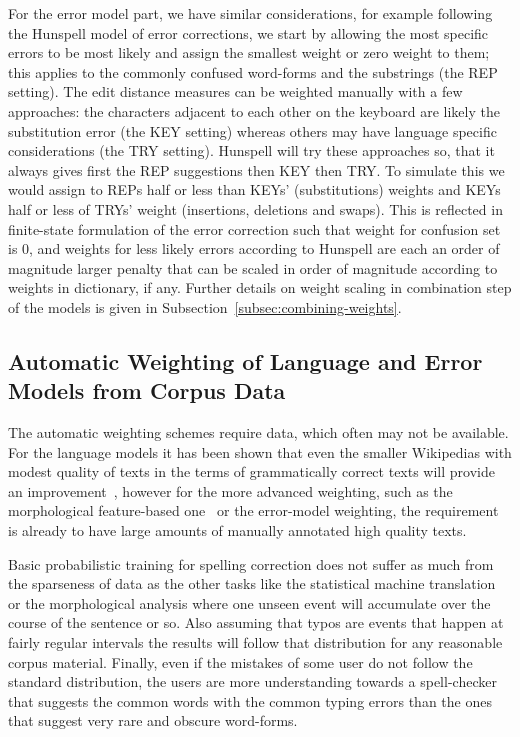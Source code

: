 \documentclass[a4paper,12pt]{article}
\begin{document}
For the error model part, we have similar considerations, for example
following the Hunspell model of error corrections, we start by allowing the
most specific errors to be most likely and assign the smallest weight or zero
weight to them; this applies to the commonly confused word-forms and the
substrings (the REP setting). The edit distance measures can be weighted
manually with a few approaches: the characters adjacent to each other on the
keyboard are likely the substitution error (the KEY setting) whereas others
may have language specific considerations (the TRY setting).  Hunspell will try
these approaches so, that it always gives first the REP suggestions then KEY
then TRY. To simulate this we would assign to REPs half or less than KEYs'
(substitutions) weights and KEYs half or less of TRYs' weight (insertions,
deletions and swaps). This is reflected in finite-state formulation of the
error correction such that weight for confusion set is 0, and weights for
less likely errors according to Hunspell are each an order of magnitude larger
penalty that can be scaled in order of magnitude according to weights in
dictionary, if any. Further details on weight scaling in combination step of
the models is given in Subsection~\ref{subsec:combining-weights}.

\subsection{Automatic Weighting of Language and Error Models from Corpus Data}
\label{subsec:automatic-weighting}

The automatic weighting schemes require data, which often may not be available.
For the language models it has been shown that even the smaller Wikipedias
with modest quality of texts in the terms of grammatically correct texts will
provide an improvement~\cite[]{pirinen/2010/lrec}, however for the more
advanced weighting, such as the morphological feature-based
one~\cite[]{pirinen2012improving} or the error-model weighting, the requirement
is already to have large amounts of manually annotated high quality texts. 

Basic probabilistic training for spelling correction does not suffer as much
from the sparseness of data as the other tasks like the statistical machine
translation or the morphological analysis where one unseen event will
accumulate over the course of the sentence or so. Also assuming that typos are
events that happen at fairly regular intervals the results will follow that
distribution for any reasonable corpus material. Finally, even if the mistakes
of some user do not follow the standard distribution, the users are more
understanding towards a spell-checker that suggests the common words with the
common typing errors than the ones that suggest very rare and obscure
word-forms.
\end{document}
